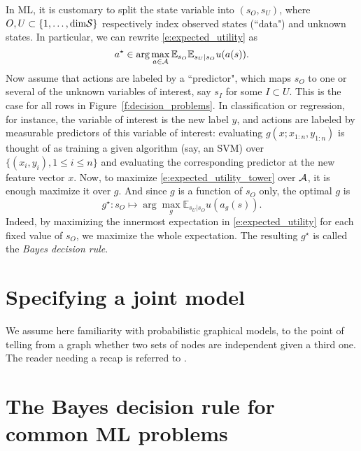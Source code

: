 In ML, it is customary to split the state variable into $(s_O,s_U)$, where $O,U\subset \{1,\dots,\text{dim} \mathcal{S}\}$ respectively index observed states (``data") and  unknown states. 
In particular, we can rewrite \eqref{e:expected_utility} as
\begin{equation}
    a^\star \in \arg\max_{a\in\mathcal{A}} \mathbb{E}_{s_O} \mathbb{E}_{s_U\vert s_O} u(a(s)).
    \label{e:expected_utility_tower}
\end{equation}
Now assume that actions are labeled by a ``predictor", which maps $s_O$ to one or several of the unknown variables of interest, say $s_I$ for some $I\subset U$. 
This is the case for all rows in Figure~\ref{f:decision_problems}. 
In classification or regression, for instance, the variable of interest is the new label $y$, and actions are labeled by measurable predictors of this variable of interest: evaluating $g(x; x_{1:n}, y_{1:n})$ is thought of as training a given algorithm (say, an SVM) over $\{(x_i,y_i), 1\leq i\leq n\}$ and evaluating the corresponding predictor at the new feature vector $x$.
Now, to maximize \eqref{e:expected_utility_tower} over $\mathcal{A}$, it is enough maximize it over $g$. 
And since $g$ is a function of $s_O$ only, the optimal $g$ is 
\begin{equation}
    \label{e:posterior_expected_utility}
    g^\star: s_O \mapsto \arg\max_{g} \mathbb{E}_{s_U\vert s_O} u(a_g(s)).
\end{equation}
Indeed, by maximizing the innermost expectation in \eqref{e:expected_utility} for each fixed value of $s_O$, we maximize the whole expectation. 
The resulting $g^\star$ is called the \emph{Bayes decision rule}.

\section{Specifying a joint model}
We assume here familiarity with probabilistic graphical models, to the point of telling from a graph whether two sets of nodes are independent given a third one. 
The reader needing a recap is referred to \citep[Sections 10.1 to 10.5]{Mur12}.

\section{The Bayes decision rule for common ML problems}